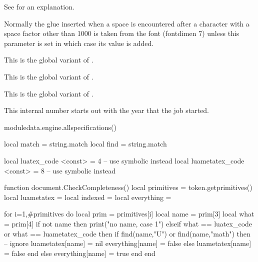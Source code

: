 \startoldprimitive[title={\prm {xleaders}}]

See  for an explanation.

\stopoldprimitive

\startoldprimitive[title={\prm {xspaceskip}}]

Normally the glue inserted when a space is encountered after a character with a
space factor other than 1000 is taken from the font (fontdimen 7) unless this
parameter is set in which case its value is added.

\stopoldprimitive

\startnewprimitive[title={\prm {xtoks}}]

This is the global variant of .

\stopnewprimitive

\startnewprimitive[title={\prm {xtoksapp}}]

This is the global variant of .

\stopnewprimitive

\startnewprimitive[title={\prm {xtokspre}}]

This is the global variant of .

\stopnewprimitive

\startoldprimitive[title={\prm {year}}]

This internal number starts out with the year that the job started.

\stopoldprimitive

\stopsection

\glet\foo\relax

\page

\startsection[title=Syntax]

\startpagecolumns[page=no]
    \startluacode
        moduledata.engine.allspecifications()
    \stopluacode
\stoppagecolumns

\stopsection

\page

\startluacode
    local match = string.match
    local find  = string.match

    local luatex_code     <const> = 4 -- use symbolic instead
    local luametatex_code <const> = 8 -- use symbolic instead

    function document.CheckCompleteness()
        local primitives = token.getprimitives()
        local luametatex = { }
        local indexed    = { }
        local everything = { }

        for i=1,#primitives do
            local prim = primitives[i]
            local name = prim[3]
            local what = prim[4]
            if not name then
                print("no name, case 1")
            elseif what == luatex_code or what == luametatex_code then
                if find(name,"U") or find(name,"math") then
                    -- ignore
                    luametatex[name] = nil
                    everything[name] = false
                else
                    luametatex[name] = false
                end
            else
                everything[name] = true
            end
        end

